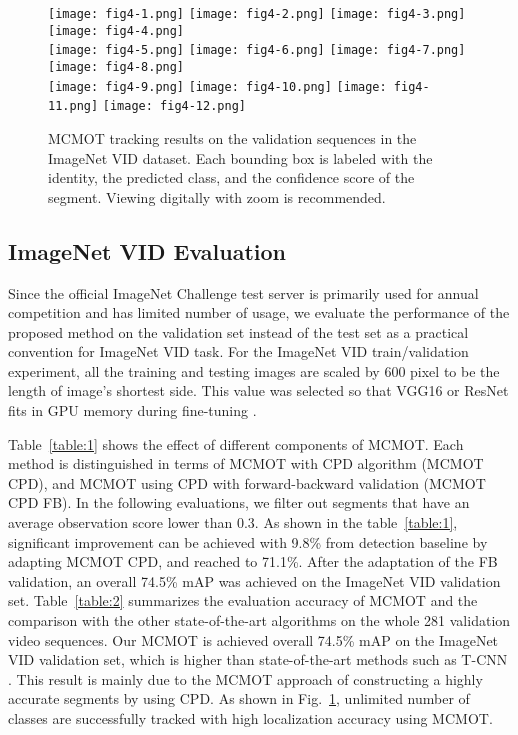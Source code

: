 \documentclass[runningheads]{llncs}
\begin{document}
\begin{figure}[t!]
\centering
\texttt{[image: fig4-1.png]}
\texttt{[image: fig4-2.png]}
\texttt{[image: fig4-3.png]}
\texttt{[image: fig4-4.png]}\\
\texttt{[image: fig4-5.png]}
\texttt{[image: fig4-6.png]}
\texttt{[image: fig4-7.png]}
\texttt{[image: fig4-8.png]}\\
\texttt{[image: fig4-9.png]}
\texttt{[image: fig4-10.png]}
\texttt{[image: fig4-11.png]}
\texttt{[image: fig4-12.png]}
\caption{MCMOT tracking results on the validation sequences in the ImageNet VID dataset. Each bounding box is labeled with the identity, the predicted class, and the confidence score of the segment. Viewing digitally with zoom is recommended.}
\label{fig:4}
\end{figure}

\subsection{ImageNet VID Evaluation}

Since the official ImageNet Challenge test server is primarily used for annual competition and has limited number of usage, we evaluate the performance of the proposed method on the validation set instead of the test set as a practical convention \cite{Ref20} for ImageNet VID task. For the ImageNet VID train/validation experiment, all the training and testing images are scaled by 600 pixel to be the length of image's shortest side. This value was selected so that VGG16 or ResNet fits in GPU memory during fine-tuning \cite{Ref28}.

Table~\ref{table:1} shows the effect of different components of MCMOT. Each method is distinguished in terms of MCMOT with CPD algorithm (MCMOT CPD), and MCMOT using CPD with forward-backward validation (MCMOT CPD FB). In the following evaluations, we filter out segments that have an average observation score lower than 0.3. As shown in the table~\ref{table:1}, significant improvement can be achieved with 9.8\% from detection baseline by adapting MCMOT CPD, and reached to 71.1\%. After the adaptation of the FB validation, an overall 74.5\% mAP was achieved on the ImageNet VID validation set. Table~\ref{table:2} summarizes the evaluation accuracy of MCMOT and the comparison with the other state-of-the-art algorithms on the whole 281 validation video sequences. Our MCMOT is achieved overall 74.5\% mAP on the ImageNet VID validation set, which is higher than state-of-the-art methods such as T-CNN \cite{Ref20}. This result is mainly due to the MCMOT approach of constructing a highly accurate segments by using CPD. As shown in Fig.~\ref{fig:4}, unlimited number of classes are successfully tracked with high localization accuracy using MCMOT.
\end{document}
